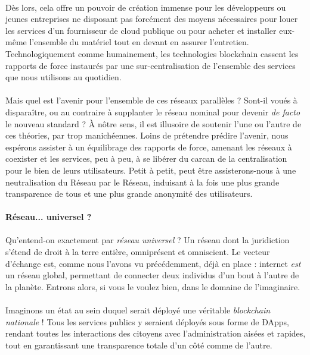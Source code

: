 \paragraph{} Dès lors, cela offre un pouvoir de création immense pour les développeurs ou jeunes entreprises ne disposant 
pas forcément des moyens nécessaires pour louer les services d'un fournisseur de cloud publique ou pour acheter et installer
eux-même l'ensemble du matériel tout en devant en assurer l'entretien. Technologiquement comme humainement, les technologies
blockchain cassent les rapports de force instaurés par une sur-centralisation de l'ensemble des services que nous utilisons
au quotidien.

\paragraph{} Mais quel est l'avenir pour l'ensemble de ces réseaux parallèles ? Sont-il voués à disparaître, ou au contraire
à supplanter le réseau nominal pour devenir \emph{de facto} le nouveau standard ? À nôtre sens, il est illusoire de soutenir
l'une ou l'autre de ces théories, par trop manichéennes. Loins de prétendre prédire l'avenir, nous espérons assister à un 
équilibrage des rapports de force, amenant les réseaux à coexister et les services, peu à peu, à se libérer du carcan de la
centralisation pour le bien de leurs utilisateurs. Petit à petit, peut être assisterons-nous à une neutralisation du Réseau
par le Réseau, induisant à la fois une plus grande transparence de tous et une plus grande anonymité des utilisateurs.


\paragraph{Réseau... universel ?}

\paragraph{} Qu'entend-on exactement par \emph{réseau universel} ? Un réseau \guillemotleft dont la juridiction s'étend de
droit à la terre entière\guillemotright \cite{Universel0}, omniprésent et omniscient. Le vecteur d'échange est, comme nous 
l'avons vu précédemment, déjà en place : internet \emph{est} un réseau global, permettant de connecter deux individus d'un 
bout à l'autre de la planète. Entrons alors, si vous le voulez bien, dans le domaine de l'imaginaire.

\paragraph{} Imaginons un état au sein duquel serait déployé une véritable \emph{blockchain nationale} ! Tous les services
publics y seraient déployés sous forme de ÐApps, rendant toutes les interactions des citoyens avec l'administration aisées
et rapides, tout en garantissant une transparence totale d'un côté comme de l'autre. 

